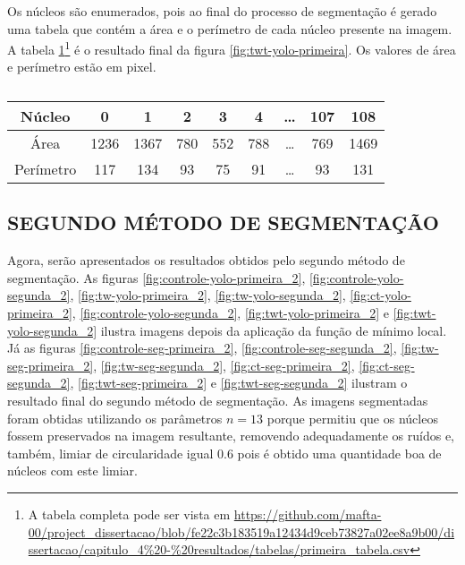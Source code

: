 Os núcleos são enumerados, pois ao final do processo de segmentação é gerado uma tabela que contém a área e o perímetro de cada núcleo presente na imagem. A tabela \ref{tab:resultados-primeiro-metodo}\footnote{A tabela completa pode ser vista em \url{https://github.com/mafta-00/project_dissertacao/blob/fe22c3b183519a12434d9ceb73827a02ee8a9b00/dissertacao/capitulo_4\%20-\%20resultados/tabelas/primeira_tabela.csv}} é o resultado final da figura \ref{fig:twt-yolo-primeira}. Os valores de área e perímetro estão em pixel.

\begin{table}[h]
    \centering
    \caption{}
    \begin{tabular}{c|c|c|c|c|c|c|c|c}
        \hline
        Núcleo    & 0 & 1 & 2 & 3 & 4 & \dots & 107 & 108 \\
        \hline    
        Área      & 1236 & 1367 & 780 & 552 & 788 & \dots & 769 & 1469 \\
        \hline  
        Perímetro &  117 & 134 & 93 & 75 & 91 & \dots & 93 & 131 \\
        \hline
    \end{tabular}
    \label{tab:resultados-primeiro-metodo}
\end{table}

\subsection{SEGUNDO MÉTODO DE SEGMENTAÇÃO}

Agora, serão apresentados os resultados obtidos pelo segundo método de segmentação. As figuras \ref{fig:controle-yolo-primeira_2}, \ref{fig:controle-yolo-segunda_2}, \ref{fig:tw-yolo-primeira_2}, \ref{fig:tw-yolo-segunda_2}, \ref{fig:ct-yolo-primeira_2}, \ref{fig:controle-yolo-segunda_2}, \ref{fig:twt-yolo-primeira_2} e \ref{fig:twt-yolo-segunda_2} ilustra imagens depois da aplicação da função de mínimo local. Já as figuras \ref{fig:controle-seg-primeira_2}, \ref{fig:controle-seg-segunda_2}, \ref{fig:tw-seg-primeira_2}, \ref{fig:tw-seg-segunda_2}, \ref{fig:ct-seg-primeira_2}, \ref{fig:ct-seg-segunda_2}, \ref{fig:twt-seg-primeira_2} e \ref{fig:twt-seg-segunda_2} ilustram o resultado final do segundo método de segmentação. As imagens segmentadas foram obtidas utilizando os parâmetros $n = 13$ porque permitiu que os núcleos fossem preservados na imagem resultante, removendo adequadamente os ruídos e, também, limiar de circularidade igual $0.6$ pois é obtido uma quantidade boa de núcleos com este limiar.

